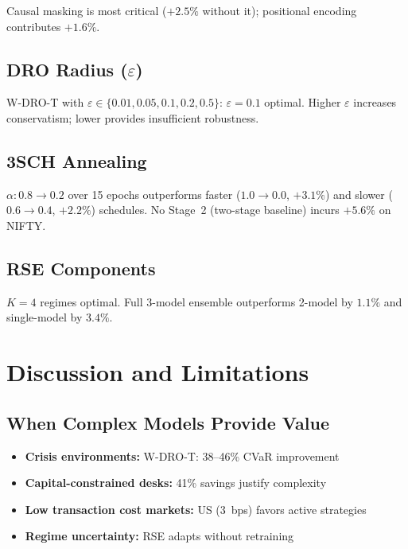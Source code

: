 \documentclass[11pt]{article}
\begin{document}
Causal masking is most critical ($+2.5\%$ without it); positional encoding contributes $+1.6\%$.

\subsection{DRO Radius ($\varepsilon$)}

W-DRO-T with $\varepsilon \in \{0.01, 0.05, 0.1, 0.2, 0.5\}$: $\varepsilon = 0.1$ optimal. Higher $\varepsilon$ increases conservatism; lower provides insufficient robustness.

\subsection{3SCH Annealing}

$\alpha: 0.8 \to 0.2$ over 15 epochs outperforms faster ($1.0 \to 0.0$, $+3.1\%$) and slower ($0.6 \to 0.4$, $+2.2\%$) schedules. No Stage~2 (two-stage baseline) incurs $+5.6\%$ on NIFTY.

\subsection{RSE Components}

$K = 4$ regimes optimal. Full 3-model ensemble outperforms 2-model by $1.1\%$ and single-model by $3.4\%$.

\section{Discussion and Limitations}
\label{sec:discussion}

\subsection{When Complex Models Provide Value}

\begin{itemize}[noitemsep]
    \item \textbf{Crisis environments:} W-DRO-T: 38--46\% CVaR improvement
    \item \textbf{Capital-constrained desks:} 41\% savings justify complexity
    \item \textbf{Low transaction cost markets:} US (3~bps) favors active strategies
    \item \textbf{Regime uncertainty:} RSE adapts without retraining
\end{itemize}
\end{document}
